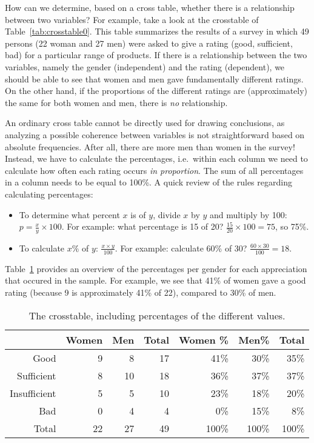 How can we determine, based on a cross table, whether there is a relationship between two variables? For example, take a look at the crosstable of Table~\ref{tab:crosstable0}. This table summarizes the results of a survey in which 49 persons (22 woman and 27 men) were asked to give a rating (good, sufficient, bad) for a particular range of products. If there is a relationship between the two variables, namely the gender (independent) and the rating (dependent), we should be able to see that women and men gave fundamentally different ratings. On the other hand, if the proportions of the different ratings are (approximately) the same for both women and men, there is \emph{no} relationship.

An ordinary cross table cannot be directly used for drawing conclusions, as analyzing a possible coherence between variables is not straightforward based on absolute frequencies. After all, there are more men than women in the survey! Instead, we have to calculate the percentages, i.e.~within each column we need to calculate how often each rating occurs \emph{in proportion}. The sum of all percentages in a column needs to be equal to 100\%. A quick review of the rules regarding calculating percentages:

\begin{itemize}
  \item To determine what percent $x$ is of $y$, divide $x$ by $y$ and multiply by 100: $p = \frac{x}{y} \times 100$. For example: what percentage is 15 of 20? $\frac{15}{20} \times 100 = 75$, so 75\%.
  \item To calculate $x\%$ of $y$: $\frac{x \times y}{100}$. For example: calculate 60\% of 30? $\frac{60 \times 30}{100} = 18$.
\end{itemize}

Table~\ref{tab:crosstable1} provides an overview of the percentages per gender for each appreciation that occured in the sample. For example, we see that 41\% of women gave a good rating (because 9 is approximately 41\% of 22), compared to 30\% of men.

\begin{table} \centering
  \begin{tabular}{@{}rrrrrrr@{}}
  	\toprule
                & Women & Men &  Total & Women \% & Men\% & Total  \\
  	\midrule
  	       Good &     9 &   8 &     17 &     41\% &  30\% &   35\% \\
     Sufficient &     8 &  10 &     18 &     36\% &  37\% &   37\% \\
   Insufficient &     5 &   5 &     10 &     23\% &  18\% &   20\% \\
            Bad &     0 &   4 &      4 &      0\% &  15\% &    8\% \\
  	      Total &    22 &  27 &     49 &    100\% & 100\% &  100\% \\
  	\bottomrule
  \end{tabular}
  \caption{The crosstable, including percentages of the different values.}
  \label{tab:crosstable1}
\end{table}

